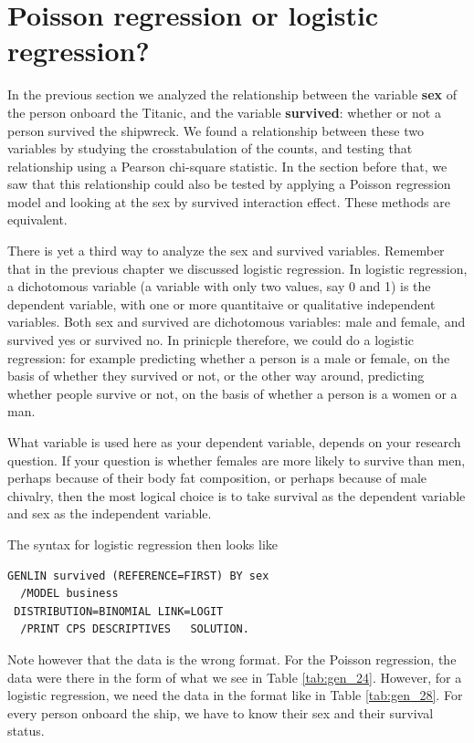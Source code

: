 \documentclass[]{report}\usepackage[]{graphicx}\usepackage[]{color}
\begin{document}
\section{Poisson regression or logistic regression?}


In the previous section we analyzed the relationship between the variable \textbf{sex} of the person onboard the Titanic, and the variable \textbf{survived}: whether or not a person survived the shipwreck. We found a relationship between these two variables by studying the crosstabulation of the counts, and testing that relationship using a Pearson chi-square statistic. In the section before that, we saw that this relationship could also be tested by applying a Poisson regression model and looking at the sex by survived interaction effect. These methods are equivalent.

There is yet a third way to analyze the sex and survived variables. Remember that in the previous chapter we discussed logistic regression. In logistic regression, a dichotomous variable (a variable with only two values, say 0 and 1) is the dependent variable, with one or more quantitaive or qualitative independent variables. Both sex and survived are dichotomous variables: male and female, and survived yes or survived no. In prinicple therefore, we could do a logistic regression: for example predicting whether a person is a male or female, on the basis of whether they survived or not, or the other way around, predicting whether people survive or not, on the basis of whether a person is a women or a man.


What variable is used here as your dependent variable, depends on your research question. If your question is whether females are more likely to survive than men, perhaps because of their body fat composition, or perhaps because of male chivalry, then the most logical choice is to take survival as the dependent variable and sex as the independent variable.

The syntax for logistic regression then looks like

\begin{verbatim}
GENLIN survived (REFERENCE=FIRST) BY sex
  /MODEL business
 DISTRIBUTION=BINOMIAL LINK=LOGIT
  /PRINT CPS DESCRIPTIVES   SOLUTION.
\end{verbatim}


Note however that the data is the wrong format. For the Poisson regression, the data were there in the form of what we see in Table \ref{tab:gen_24}. However, for a logistic regression, we need the data in the format like in Table \ref{tab:gen_28}. For every person onboard the ship, we have to know their sex and their survival status.
\end{document}
